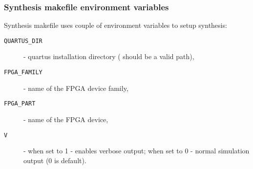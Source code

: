     \subsubsection{Synthesis makefile environment variables}
    \label{sec:syn_make_var}
    
    Synthesis makefile uses couple of environment variables to setup synthesis:
    \begin{description}
    \item[\texttt{QUARTUS\_DIR}] - quartus installation directory ( should be a valid path),
    \item[\texttt{FPGA\_FAMILY}] - name of the FPGA device family,
    \item[\texttt{FPGA\_PART}] - name of the FPGA device,
    \item[\texttt{V}] - when set to 1 - enables verbose output; when set to 0 - normal simulation output (0 is default).
    \end{description}
    
